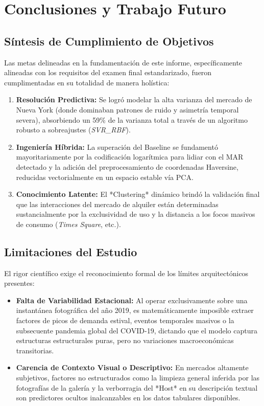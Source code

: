 \chapter{Conclusiones y Trabajo Futuro}

\section{Síntesis de Cumplimiento de Objetivos}
Las metas delineadas en la fundamentación de este informe, específicamente alineadas con los requisitos del examen final estandarizado, fueron cumplimentadas en su totalidad de manera holística:
\begin{enumerate}
    \item \textbf{Resolución Predictiva:} Se logró modelar la alta varianza del mercado de Nueva York (donde dominaban patrones de ruido y asimetría temporal severa), absorbiendo un 59\% de la varianza total a través de un algoritmo robusto a sobreajustes (\textit{SVR\_RBF}).
    \item \textbf{Ingeniería Híbrida:} La superación del Baseline se fundamentó mayoritariamente por la codificación logarítmica para lidiar con el MAR detectado y la adición del preprocesamiento de coordenadas Haversine, reducidas vectorialmente en un espacio estable vía PCA.
    \item \textbf{Conocimiento Latente:} El *Clustering* dinámico brindó la validación final que las interacciones del mercado de alquiler están determinadas sustancialmente por la exclusividad de uso y la distancia a los focos masivos de consumo (\textit{Times Square}, etc.).
\end{enumerate}

\section{Limitaciones del Estudio}
El rigor científico exige el reconocimiento formal de los límites arquitectónicos presentes:
\begin{itemize}
    \item \textbf{Falta de Variabilidad Estacional:} Al operar exclusivamente sobre una instantánea fotográfica del año 2019, es matemáticamente imposible extraer factores de picos de demanda estival, eventos temporales masivos o la subsecuente pandemia global del COVID-19, dictando que el modelo captura estructuras estructurales puras, pero no variaciones macroeconómicas transitorias.
    \item \textbf{Carencia de Contexto Visual o Descriptivo:} En mercados altamente subjetivos, factores no estructurados como la limpieza general inferida por las fotografías de la galería y la verborragia del *Host* en su descripción textual son predictores ocultos inalcanzables en los datos tabulares disponibles.
\end{itemize}

